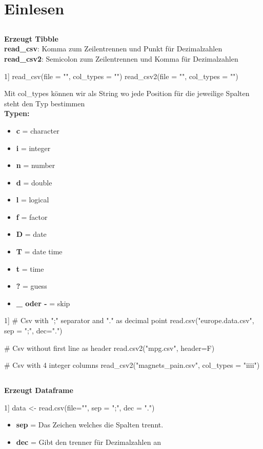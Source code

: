 \section{Einlesen}
\subsection{}
\textbf{Erzeugt Tibble}\\
\textbf{read\_csv}: Komma zum Zeilentrennen und Punkt für Dezimalzahlen\\
\textbf{read\_csv2}: Semicolon zum Zeilentrennen und Komma für Dezimalzahlen
\begin{rcode}{1]}
read_csv(file = "", col_types = "")
read_csv2(file = "", col_types = "")
\end{rcode}
Mit col\_types können wir als String wo jede Position für die jeweilige Spalten steht den Typ bestimmen\\
\textbf{Typen:}
\begin{itemize}[noitemsep]
  \item \textbf{c} = character
  \item \textbf{i} = integer
  \item \textbf{n} = number
  \item \textbf{d} = double
  \item \textbf{l} = logical
  \item \textbf{f} = factor
  \item \textbf{D} = date
  \item \textbf{T} = date time
  \item \textbf{t} = time
  \item \textbf{?} = guess
  \item \textbf{\_ oder -} = skip
\end{itemize}
\begin{rcode}{1]}
# Csv with ";" separator and "." as decimal point
read.csv("europe.data.csv", sep = ";", dec=".")

# Csv without first line as header
read.csv2("mpg.csv", header=F)

# Csv with 4 integer columns
read_csv2("magnets_pain.csv", 
            col_types = "iiii")
\end{rcode}
\subsection{}
\textbf{Erzeugt Dataframe}
\begin{rcode}{1]}
data <- read.csv(file="", sep = ";", dec = ".") %
\end{rcode}
\begin{itemize}[noitemsep]
  \item \textbf{sep} = Das Zeichen welches die Spalten trennt.
  \item \textbf{dec} = Gibt den trenner für Dezimalzahlen an
\end{itemize}
